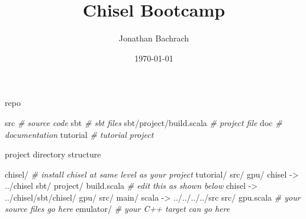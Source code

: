 \documentclass[xcolor=pdflatex,dvipsnames,table]{beamer}
\title{Chisel Bootcamp}
\author{Jonathan Bachrach}
\date{\today}
\institute[UC Berkeley]{EECS UC Berkeley}
\newenvironment{FramedSemiVerb}%
{\begin{Sbox}\begin{minipage}{.94\textwidth}\begin{semiverbatim}}%
{\end{semiverbatim}\end{minipage}\end{Sbox}
\setlength{\fboxsep}{8pt}\fbox{\TheSbox}}
\newenvironment{FramedVerb}%
{\VerbatimEnvironment
\begin{Sbox}\begin{minipage}{.94\textwidth}\begin{Verbatim}}%
{\end{Verbatim}\end{minipage}\end{Sbox}
\setlength{\fboxsep}{8pt}\fbox{\TheSbox}}
\newcommand{\comment}[1]{{\color{Green}\it\smaller #1}}
\begin{document}
\begin{frame}
\titlepage
\end{frame}



\begin{frame}[fragile]{repo}
\begin{FramedSemiVerb}
src                     \comment{\# source code}
sbt                     \comment{\# sbt files}
sbt/project/build.scala \comment{\# project file}
doc                     \comment{\# documentation}
tutorial                \comment{\# tutorial project}
\end{FramedSemiVerb}
\end{frame}

\begin{frame}[fragile]{project directory structure}
\begin{footnotesize}
\begin{FramedSemiVerb}{0.95}
chisel/           \comment{\# install chisel at same level as your project}
  tutorial/
  src/
gpu/
  chisel -> ../chisel
  sbt/
    project/
      build.scala \comment{\# edit this as shown below}
    chisel -> ../chisel/sbt/chisel/
    gpu/
      src/
        main/
          scala -> ../../../../src
  src/ 
    gpu.scala     \comment{\# your source files go here}
  emulator/       \comment{\# your C++ target can go here}
\end{FramedSemiVerb}
\end{footnotesize}

\end{frame}
\end{document}
